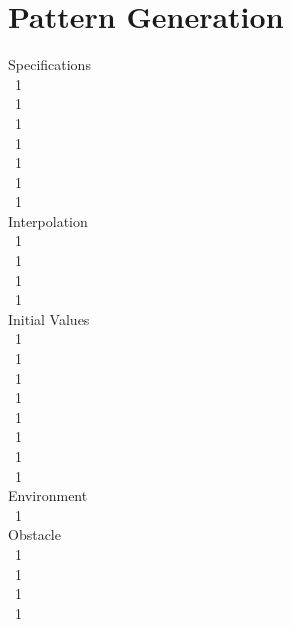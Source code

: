 \section{Pattern Generation}
\label{sec::32_pg}

\begin{minipage}{1.\textwidth}
	\begin{minipage}{0.3\textwidth}
		\scriptsize{
			\hfill Specifications\\
			\mbox{}~\hfill 1\\
			\mbox{}~\hfill 1\\
			\mbox{}~\hfill 1\\
			\mbox{}~\hfill 1\\
			\mbox{}~\hfill 1\\
			\mbox{}~\hfill 1\\
			\mbox{}~\hfill 1\\
			
			\hfill Interpolation\\
			\mbox{}~\hfill 1\\
			\mbox{}~\hfill 1\\
			\mbox{}~\hfill 1\\
			\mbox{}~\hfill 1\\
			
			\hfill Initial Values\\
			\mbox{}~\hfill 1\\
			\mbox{}~\hfill 1\\
			\mbox{}~\hfill 1\\
			\mbox{}~\hfill 1\\
			\mbox{}~\hfill 1\\
			\mbox{}~\hfill 1\\
			\mbox{}~\hfill 1\\
			\mbox{}~\hfill 1\\
			
			\hfill Environment\\
			\mbox{}~\hfill 1\\
			
			\hfill Obstacle\\
			\mbox{}~\hfill 1\\
			\mbox{}~\hfill 1\\
			\mbox{}~\hfill 1\\
			\mbox{}~\hfill 1\\
			
}
\end{minipage}
\end{minipage}
